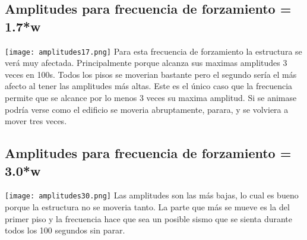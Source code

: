 \documentclass[11pt,letterpaper]{exam}
\begin{document}
\subsection{ Amplitudes para frecuencia de forzamiento = 1.7*w}
\texttt{[image: amplitudes17.png]}
Para esta frecuencia de forzamiento la estructura se verá muy afectada. Principalmente porque alcanza sus maximas amplitudes 3 veces en 100s. Todos los pisos se moverian bastante pero el segundo sería el más afecto al tener las amplitudes más altas. Este es el único caso que la frecuencia permite que se alcance por lo menos 3 veces su maxima amplitud. Si se animase podría verse como el edificio se moveria abruptamente, parara, y se volviera a mover tres veces.


\subsection{ Amplitudes para frecuencia de forzamiento = 3.0*w}
\texttt{[image: amplitudes30.png]}
Las amplitudes son las más bajas, lo cual es bueno porque la estructura no se moveria tanto. La parte que más se mueve es la del primer piso y la frecuencia hace que sea un posible sismo que se sienta durante todos los 100 segundos sin parar.

\end{document}
